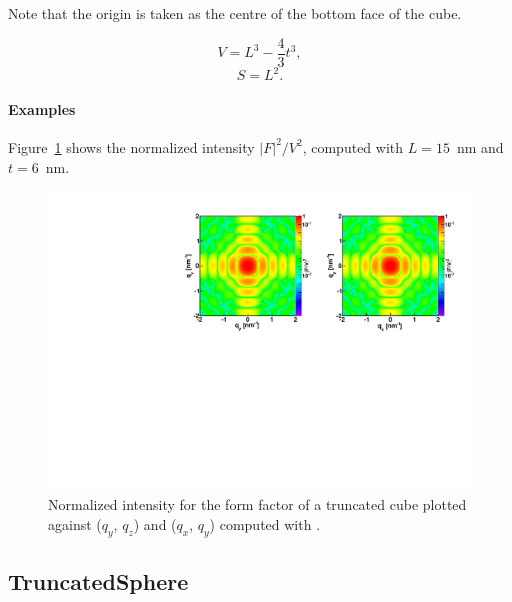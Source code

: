 Note that the origin is taken as the centre of the bottom face of the cube.



\begin{equation*}
  V = L^3 - \dfrac{4}{3}t^3,
\end{equation*}
\begin{equation*}
  S = L^2.
\end{equation*}

\paragraph{Examples}
Figure~\ref{fig:FFtrunccubeEx} shows the normalized intensity
$|F|^2/V^2$, computed with $L=15$~nm  and $t=6$~nm.

\begin{figure}[h]
\begin{center}
\includegraphics[angle=-90,width=\textwidth]{fig/ff/figfftruncatedcube.pdf}
\end{center}
\caption{Normalized intensity for the form factor of a truncated cube plotted against ($q_y$, $q_z$) and  ($q_x$, $q_y$)
  computed with .}
\label{fig:FFtrunccubeEx}
\end{figure}

\clearpage
\subsection{TruncatedSphere}\label{sec:TruncatedSphere}
  
